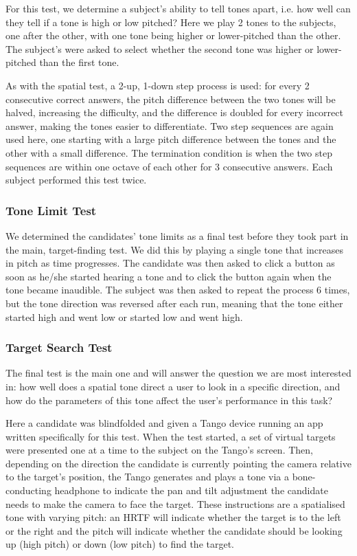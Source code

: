 \documentclass[format=sigconf, review=true, screen=true, anonymous=true]{acmart}
\begin{document}
For this test, we determine a subject's ability to tell tones apart, i.e. how well can they tell if a tone is high or low pitched? Here we play 2 tones to the subjects, one after the other, with one tone being higher or lower-pitched than the other. The subject's were asked to select whether the second tone was higher or lower-pitched than the first tone.

As with the spatial test, a 2-up, 1-down step process is used: for every 2 consecutive correct answers, the pitch difference between the two tones will be halved, increasing the difficulty, and the difference is doubled for every incorrect answer, making the tones easier to differentiate. Two step sequences are again used here, one starting with a large pitch difference between the tones and the other with a small difference. The termination condition is when the two step sequences are within one octave of each other for 3 consecutive answers. Each subject performed this test twice. 

\subsubsection{Tone Limit Test}

We determined the candidates' tone limits as a final test before they took part in the  main, target-finding test. We did this by playing a single tone that increases in pitch as time progresses. The candidate was then asked to click a button as soon as he/she started hearing a tone and to click the button again when the tone became inaudible. The subject was then asked to repeat the process 6 times, but the tone direction was reversed after each run, meaning that the tone either started high and went low or started low and went high. 

\subsubsection{Target Search Test}

The final test is the main one and will answer the question we are most interested in: how well does a spatial tone direct a user to look in a specific direction, and how do the parameters of this tone affect the user's performance in this task? 

Here a candidate was blindfolded and given a Tango device running an app written specifically for this test. When the test started, a set of virtual targets were presented one at a time to the subject on the Tango's screen. Then, depending on the direction the candidate is currently pointing the camera relative to the target's position, the Tango generates and plays a tone via a bone-conducting headphone to indicate the pan and tilt adjustment the candidate needs to make the camera to face the target. These instructions are a spatialised tone with varying pitch: an HRTF will indicate whether the target is to the left or the right and the pitch will indicate whether the candidate should be looking up (high pitch) or down (low pitch) to find the target. 
\end{document}
